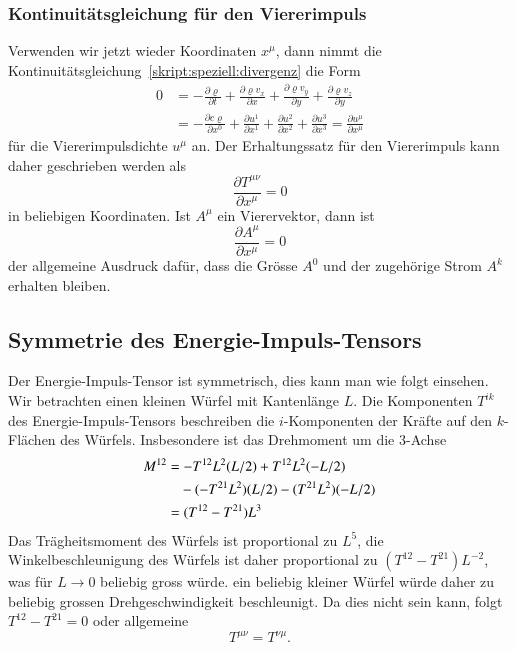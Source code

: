 \subsubsection{Kontinuitätsgleichung für den Viererimpuls}
Verwenden wir jetzt wieder Koordinaten $x^\mu$, dann nimmt die
Kontinuitätsgleichung~\eqref{skript:speziell:divergenz}
die Form
\begin{align*}
0
&=
-
\frac{\partial \varrho}{\partial t}
+
\frac{\partial \varrho v_x}{\partial x}
+
\frac{\partial \varrho v_y}{\partial y}
+
\frac{\partial \varrho v_z}{\partial y}
\\
&=
-\frac{\partial c \varrho}{\partial x^0}
+\frac{\partial u^1}{\partial x^1}
+\frac{\partial u^2}{\partial x^2}
+\frac{\partial u^3}{\partial x^3}
=
\frac{\partial u^\mu}{\partial x^\mu}
\end{align*}
für die Viererimpulsdichte $u^\mu$ an.
Der Erhaltungssatz für den Viererimpuls kann daher
geschrieben werden als
\[
\frac{\partial T^{\mu\nu}}{\partial x^\mu}
=0
\]
in beliebigen Koordinaten.
Ist $A^{\mu}$ ein Vierervektor, dann ist
\[
\frac{\partial A^\mu}{\partial x^\mu}=0
\]
der allgemeine Ausdruck dafür, dass die Grösse $A^0$ und der zugehörige
Strom $A^k$ erhalten bleiben.

\subsection{Symmetrie des Energie-Impuls-Tensors}
Der Energie-Impuls-Tensor ist symmetrisch, dies kann man wie folgt einsehen.
Wir betrachten einen kleinen Würfel mit Kantenlänge $L$.
Die Komponenten $T^{ik}$ des Energie-Impuls-Tensors beschreiben die
$i$-Komponenten der Kräfte auf den $k$-Flächen des Würfels.
Insbesondere ist das Drehmoment um die $3$-Achse
\begin{align*}
M^{12}
&=
-T^{12}L^2(L/2) + T^{12}L^2 (-L/2)
\\
&\phantom{\mathstrut=}-(-T^{21}L^2)(L/2)-(T^{21}L^2)(-L/2)
\\
&=(T^{12}-T^{21})L^3
\end{align*}
Das Trägheitsmoment des Würfels ist proportional zu $L^5$,
die Winkelbeschleunigung des Würfels ist daher proportional
zu $(T^{12}-T^{21})L^{-2}$, was für $L\to 0$ beliebig gross würde.
ein beliebig kleiner Würfel würde daher zu beliebig grossen 
Drehgeschwindigkeit beschleunigt.
Da dies nicht sein kann, folgt $T^{12}-T^{21}=0$ oder allgemeine
\[
T^{\mu\nu}=T^{\nu\mu}.
\]



